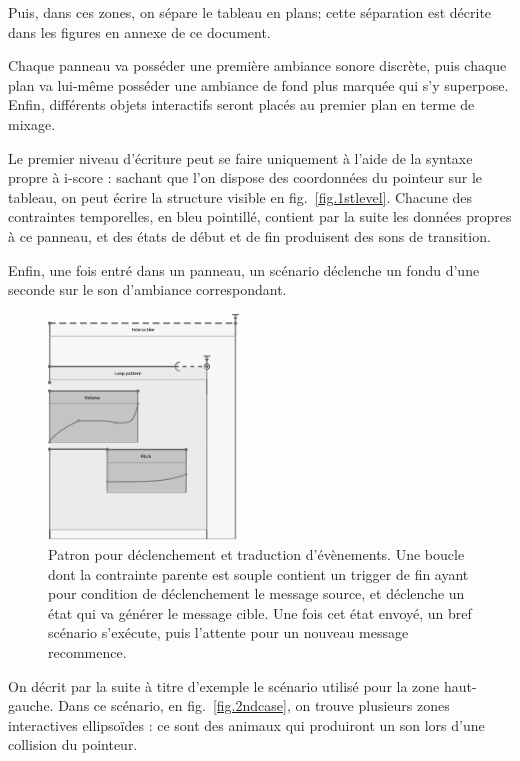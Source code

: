 \documentclass{article}
\begin{document}
    Puis, dans ces zones, on sépare le tableau en plans; cette séparation est décrite dans les figures en annexe de ce document.
    
    Chaque panneau va posséder une première ambiance sonore discrète, puis chaque plan va lui-même 
    posséder une ambiance de fond plus marquée qui s'y superpose.
    Enfin, différents objets interactifs seront placés au premier plan en terme de mixage.
    
    
    Le premier niveau d'écriture peut se faire uniquement à l'aide de la syntaxe propre à i-score : 
    sachant que l'on dispose des coordonnées du pointeur sur le tableau, on peut écrire la structure visible en fig.~\ref{fig.1stlevel}.
    Chacune des contraintes temporelles, en bleu pointillé, contient par la suite les données propres à ce panneau, et des états de début et de fin produisent des sons de transition.
    
    Enfin, une fois entré dans un panneau, un scénario déclenche un fondu d'une seconde sur le son d'ambiance correspondant.
    
    \begin{figure}
        \centering
        \includegraphics[height=6cm]{images/trigger.eps}
        \caption{Patron pour déclenchement et traduction d'évènements. Une boucle dont la contrainte parente est souple contient un trigger de fin ayant pour condition de déclenchement le message source, et déclenche un état qui va générer le message cible. Une fois cet état envoyé, un bref scénario s'exécute, puis l'attente pour un nouveau message recommence.}
        \label{fig.trigger}
    \end{figure}
    
    On décrit par la suite à titre d'exemple le scénario utilisé pour la zone haut-gauche.
    Dans ce scénario, en fig.~\ref{fig.2ndcase}, on trouve plusieurs zones interactives ellipsoïdes : ce sont des animaux qui produiront un son lors d'une collision du pointeur.
    
\end{document}
